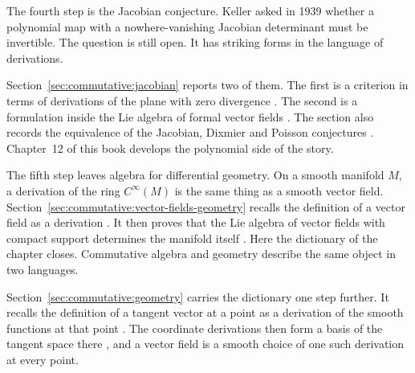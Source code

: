 The fourth step is the Jacobian conjecture. Keller asked in 1939 whether a
polynomial map with a nowhere-vanishing Jacobian determinant must be
invertible. The question is still open. It has striking forms in the language
of derivations.

Section~\ref{sec:commutative:jacobian} reports two of them. The first is a
criterion in terms of derivations of the plane with zero divergence
\cite[Example~5.2.14, pp.~130--131]{VanEssenKurodaKoenig2021}. The second is a
formulation inside the Lie algebra of formal vector fields
\cite[Proposition~1, p.~211]{HauserMuller1998}. The section also records the
equivalence of the Jacobian, Dixmier and Poisson conjectures
\cite[Theorem~4.4.1, p.~101]{VanEssenKurodaKoenig2021}. Chapter~12 of this
book develops the polynomial side of the story.

The fifth step leaves algebra for differential geometry. On a smooth manifold
$M$, a derivation of the ring $C^\infty(M)$ is the same thing as a smooth
vector field. Section~\ref{sec:commutative:vector-fields-geometry} recalls the
definition of a vector field as a derivation
\cite[p.~122]{Nestruev2020}. It then proves that the Lie algebra of vector
fields with compact support determines the manifold itself
\cite[Theorem~3, p.~471]{ShanksPursell1954}. Here the dictionary of the
chapter closes. Commutative algebra and geometry describe the same object in
two languages.

Section~\ref{sec:commutative:geometry} carries the dictionary one step
further. It recalls the definition of a tangent vector at a point as a
derivation of the smooth functions at that point
\cite[p.~70]{MajumdarBhattacharyya2023}. The coordinate derivations then form
a basis of the tangent space there
\cite[equation (2.19), p.~70]{MajumdarBhattacharyya2023}, and a vector field
is a smooth choice of one such derivation at every point.
